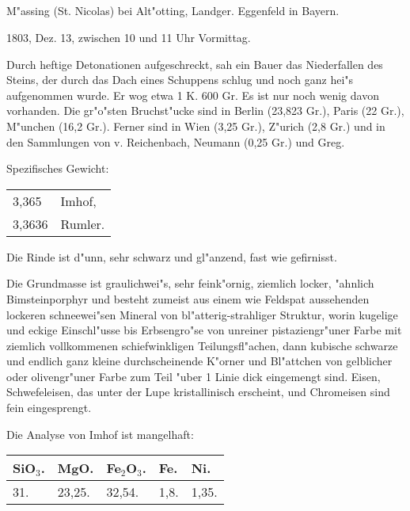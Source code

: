 \documentclass[a4paper, 11pt, oneside]{article}
\begin{document}
\subsection{}
\LARGE
\paragraph{}
M"assing (St. Nicolas) bei Alt"otting, Landger. Eggenfeld in Bayern.

1803, Dez. 13, zwischen 10 und 11 Uhr Vormittag.

Durch heftige Detonationen aufgeschreckt, sah ein Bauer das Niederfallen des Steins, der durch das Dach eines Schuppens schlug und noch ganz hei"s aufgenommen wurde. Er wog etwa 1 K. 600 Gr. Es ist nur noch wenig davon vorhanden. Die gr"o"sten Bruchst"ucke sind in Berlin (23,823 Gr.), Paris (22 Gr.), M"unchen (16,2 Gr.). Ferner sind in Wien (3,25 Gr.), Z"urich (2,8 Gr.) und in den Sammlungen von v. Reichenbach, Neumann (0,25 Gr.) und Greg.

Spezifisches Gewicht:
\begin{table}[!ht]
    \centering\swabfamily\Large
    \begin{tabular}{l l}
        3,365 & Imhof,\\
        3,3636 & Rumler.
    \end{tabular}
\end{table}

Die Rinde ist d"unn, sehr schwarz und gl"anzend, fast wie gefirnisst.

Die Grundmasse ist graulichwei"s, sehr feink"ornig, ziemlich locker, "ahnlich Bimsteinporphyr und besteht zumeist aus einem wie Feldspat aussehenden lockeren schneewei"sen Mineral von bl"atterig-strahliger Struktur, worin kugelige und eckige Einschl"usse bis Erbsengro"se von unreiner pistaziengr"uner Farbe mit ziemlich vollkommenen schiefwinkligen Teilungsfl"achen, dann kubische schwarze und endlich ganz kleine durchscheinende K"orner und Bl"attchen von gelblicher oder olivengr"uner Farbe zum Teil "uber 1 Linie dick eingemengt sind. Eisen, Schwefeleisen, das unter der Lupe kristallinisch erscheint, und Chromeisen sind fein eingesprengt.

Die Analyse von Imhof ist mangelhaft:
\begin{table}[!ht]
    \centering\swabfamily\Large
    \begin{tabular}{l l l l l}
        SiO$_{3}$. & MgO. & Fe$_{2}$O$_{3}$. & Fe. & Ni. \\ \hline
        31. & 23,25. & 32,54. & 1,8. & 1,35. \\
    \end{tabular}
\end{table}
\end{document}
